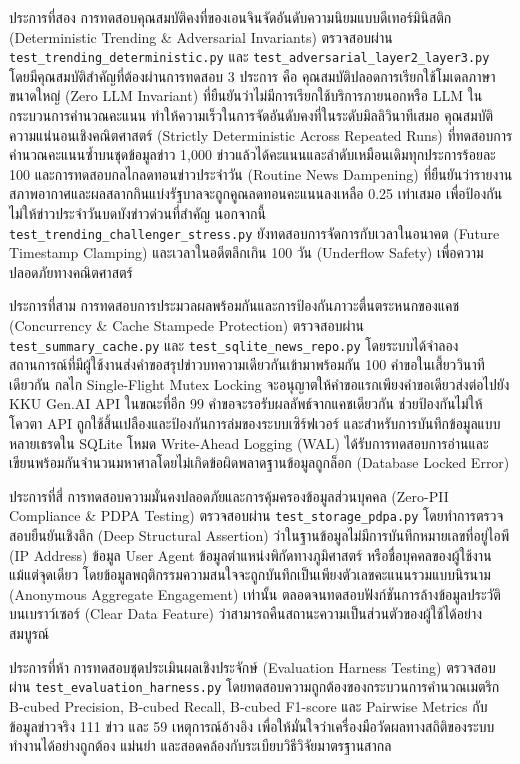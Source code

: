 ประการที่สอง การทดสอบคุณสมบัติคงที่ของเอนจินจัดอันดับความนิยมแบบดีเทอร์มินิสติก (Deterministic Trending \& Adversarial Invariants) ตรวจสอบผ่าน \texttt{test\_trending\_deterministic.py} และ \texttt{test\_adversarial\_layer2\_layer3.py} โดยมีคุณสมบัติสำคัญที่ต้องผ่านการทดสอบ 3 ประการ คือ คุณสมบัติปลอดการเรียกใช้โมเดลภาษาขนาดใหญ่ (Zero LLM Invariant) ที่ยืนยันว่าไม่มีการเรียกใช้บริการภายนอกหรือ LLM ในกระบวนการคำนวณคะแนน ทำให้ความเร็วในการจัดอันดับคงที่ในระดับมิลลิวินาทีเสมอ คุณสมบัติความแน่นอนเชิงคณิตศาสตร์ (Strictly Deterministic Across Repeated Runs) ที่ทดสอบการคำนวณคะแนนซ้ำบนชุดข้อมูลข่าว 1,000 ข่าวแล้วได้คะแนนและลำดับเหมือนเดิมทุกประการร้อยละ 100 และการทดสอบกลไกลดทอนข่าวประจำวัน (Routine News Dampening) ที่ยืนยันว่ารายงานสภาพอากาศและผลสลากกินแบ่งรัฐบาลจะถูกคูณลดทอนคะแนนลงเหลือ 0.25 เท่าเสมอ เพื่อป้องกันไม่ให้ข่าวประจำวันบดบังข่าวด่วนที่สำคัญ นอกจากนี้ \texttt{test\_trending\_challenger\_stress.py} ยังทดสอบการจัดการกับเวลาในอนาคต (Future Timestamp Clamping) และเวลาในอดีตลึกเกิน 100 วัน (Underflow Safety) เพื่อความปลอดภัยทางคณิตศาสตร์

ประการที่สาม การทดสอบการประมวลผลพร้อมกันและการป้องกันภาวะตื่นตระหนกของแคช (Concurrency \& Cache Stampede Protection) ตรวจสอบผ่าน \texttt{test\_summary\_cache.py} และ \texttt{test\_sqlite\_news\_repo.py} โดยระบบได้จำลองสถานการณ์ที่มีผู้ใช้งานส่งคำขอสรุปข่าวบทความเดียวกันเข้ามาพร้อมกัน 100 คำขอในเสี้ยววินาทีเดียวกัน กลไก Single-Flight Mutex Locking จะอนุญาตให้คำขอแรกเพียงคำขอเดียวส่งต่อไปยัง KKU Gen.AI API ในขณะที่อีก 99 คำขอจะรอรับผลลัพธ์จากแคชเดียวกัน ช่วยป้องกันไม่ให้โควตา API ถูกใช้สิ้นเปลืองและป้องกันการล่มของระบบเซิร์ฟเวอร์ และสำหรับการบันทึกข้อมูลแบบหลายเธรดใน SQLite โหมด Write-Ahead Logging (WAL) ได้รับการทดสอบการอ่านและเขียนพร้อมกันจำนวนมหาศาลโดยไม่เกิดข้อผิดพลาดฐานข้อมูลถูกล็อก (Database Locked Error)

ประการที่สี่ การทดสอบความมั่นคงปลอดภัยและการคุ้มครองข้อมูลส่วนบุคคล (Zero-PII Compliance \& PDPA Testing) ตรวจสอบผ่าน \texttt{test\_storage\_pdpa.py} โดยทำการตรวจสอบยืนยันเชิงลึก (Deep Structural Assertion) ว่าในฐานข้อมูลไม่มีการบันทึกหมายเลขที่อยู่ไอพี (IP Address) ข้อมูล User Agent ข้อมูลตำแหน่งพิกัดทางภูมิศาสตร์ หรือชื่อบุคคลของผู้ใช้งานแม้แต่จุดเดียว โดยข้อมูลพฤติกรรมความสนใจจะถูกบันทึกเป็นเพียงตัวเลขคะแนนรวมแบบนิรนาม (Anonymous Aggregate Engagement) เท่านั้น ตลอดจนทดสอบฟังก์ชันการล้างข้อมูลประวัติบนเบราว์เซอร์ (Clear Data Feature) ว่าสามารถคืนสถานะความเป็นส่วนตัวของผู้ใช้ได้อย่างสมบูรณ์

ประการที่ห้า การทดสอบชุดประเมินผลเชิงประจักษ์ (Evaluation Harness Testing) ตรวจสอบผ่าน \texttt{test\_evaluation\_harness.py} โดยทดสอบความถูกต้องของกระบวนการคำนวณเมตริก B-cubed Precision, B-cubed Recall, B-cubed F1-score และ Pairwise Metrics กับข้อมูลข่าวจริง 111 ข่าว และ 59 เหตุการณ์อ้างอิง เพื่อให้มั่นใจว่าเครื่องมือวัดผลทางสถิติของระบบทำงานได้อย่างถูกต้อง แม่นยำ และสอดคล้องกับระเบียบวิธีวิจัยมาตรฐานสากล

